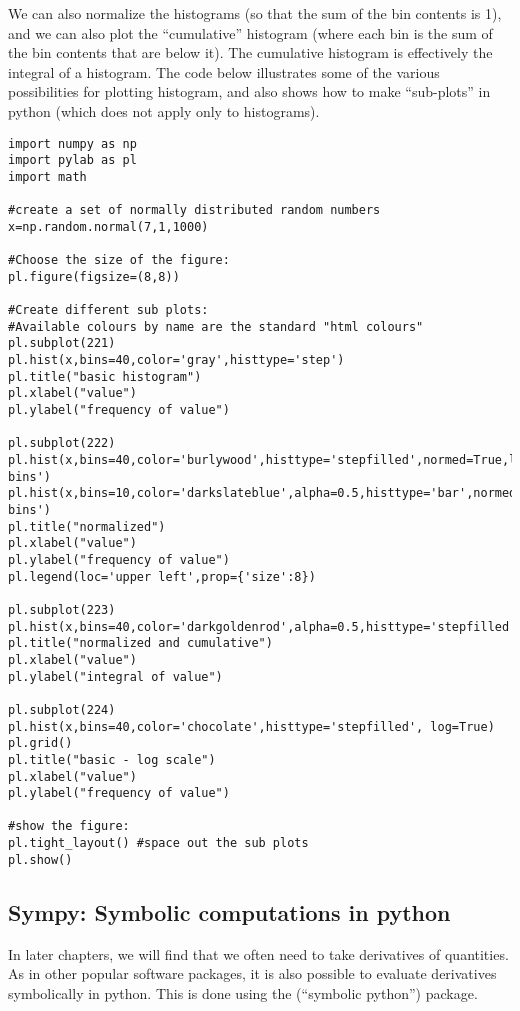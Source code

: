 We can also normalize the histograms (so that the sum of the bin contents is 1), and we can also plot the ``cumulative'' histogram (where each bin is the sum of the bin contents that are below it). The cumulative histogram is effectively the integral of a histogram. The code below illustrates some of the various possibilities for plotting histogram, and also shows how to make ``sub-plots'' in python (which does not apply only to histograms).
\begin{lstlisting}[frame=single] 
import numpy as np
import pylab as pl
import math 

#create a set of normally distributed random numbers
x=np.random.normal(7,1,1000)

#Choose the size of the figure:
pl.figure(figsize=(8,8))

#Create different sub plots:
#Available colours by name are the standard "html colours"
pl.subplot(221)
pl.hist(x,bins=40,color='gray',histtype='step')
pl.title("basic histogram")
pl.xlabel("value")
pl.ylabel("frequency of value")

pl.subplot(222)
pl.hist(x,bins=40,color='burlywood',histtype='stepfilled',normed=True,label='40 bins')
pl.hist(x,bins=10,color='darkslateblue',alpha=0.5,histtype='bar',normed=True,label='10 bins')
pl.title("normalized")
pl.xlabel("value")
pl.ylabel("frequency of value")
pl.legend(loc='upper left',prop={'size':8})

pl.subplot(223)
pl.hist(x,bins=40,color='darkgoldenrod',alpha=0.5,histtype='stepfilled',normed=True,cumulative=True)
pl.title("normalized and cumulative")
pl.xlabel("value")
pl.ylabel("integral of value")

pl.subplot(224)
pl.hist(x,bins=40,color='chocolate',histtype='stepfilled', log=True)
pl.grid()
pl.title("basic - log scale")
pl.xlabel("value")
pl.ylabel("frequency of value")

#show the figure:
pl.tight_layout() #space out the sub plots
pl.show()
\end{lstlisting}

\subsection{Sympy: Symbolic computations in python}
In later chapters, we will find that we often need to take derivatives of quantities. As in other popular software packages, it is also possible to evaluate derivatives symbolically in python. This is done using the  (``symbolic python'') package. 

